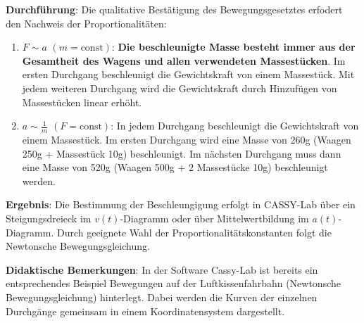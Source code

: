 \documentclass[../main.tex]{subfiles}
\begin{document}
\begin{tcolorbox}
    \vspace{0.3cm} 
    \textbf{Durchführung}: Die qualitative Bestätigung des Bewegungsgesetztes erfodert den Nachweis der Proportionalitäten:
    \begin{enumerate}
        \item $F \sim a$ $(m=\text{const})$: \textbf{Die beschleunigte Masse besteht immer aus der Gesamtheit des Wagens und allen verwendeten Massestücken}. Im ersten Durchgang beschleunigt die Gewichtskraft von einem Massestück. Mit jedem weiteren Durchgang wird die Gewichtskraft durch Hinzufügen von Massestücken linear erhöht. 
        \item $a \sim \frac{1}{m}$ $(F=\text{const})$: In jedem Durchgang beschleunigt die Gewichtskraft von einem Massestück. Im ersten Durchgang wird eine Masse von 260g (Waagen 250g + Massestück 10g) beschleunigt. Im nächsten Durchgang muss dann eine Masse von 520g (Waagen 500g + 2 Massestücke 10g) beschleunigt werden.  
    \end{enumerate}

    \vspace{0.3cm}
    \textbf{Ergebnis}: Die Bestimmung der Beschleungigung erfolgt in CASSY-Lab über ein Steigungsdreieck im $v(t)$-Diagramm oder über Mittelwertbildung im $a(t)$-Diagramm. Durch geeignete Wahl der Proportionalitätskonstanten folgt die Newtonsche Bewegungsgleichung. 

    \vspace{0.3cm}
    \textbf{Didaktische Bemerkungen}: In der Software Cassy-Lab ist bereits ein entsprechendes Beispiel \glqq Bewegungen auf der Luftkissenfahrbahn (Newtonsche Bewegungsgleichung)\grqq{} hinterlegt. Dabei werden die Kurven der einzelnen Durchgänge gemeinsam in einem Koordinatensystem dargestellt.     

\end{tcolorbox}
\end{document}
